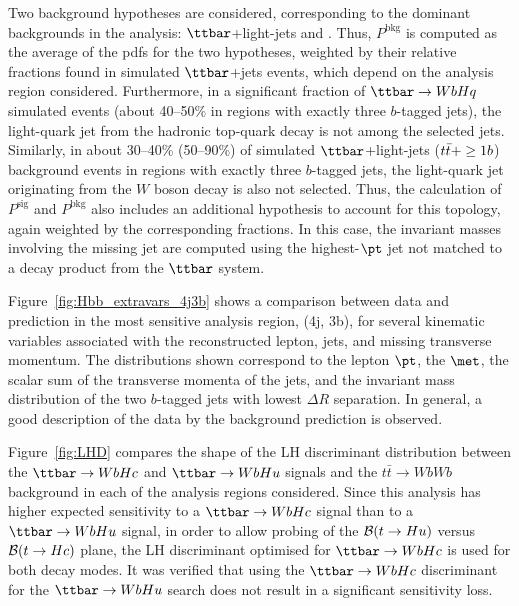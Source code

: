 Two background hypotheses are considered, corresponding to the dominant backgrounds in
the analysis: $\ttbar$+light-jets and \ttbin. Thus, $P^\textrm{bkg}$ is computed as the average of
the pdfs for the two hypotheses, weighted by their relative fractions found in simulated $\ttbar$+jets events, which depend
on the analysis region considered. Furthermore, in a significant fraction of $\Hq$ simulated events (about 40--50\% in regions with exactly three $b$-tagged jets), 
the light-quark jet from the hadronic top-quark decay is not among the selected jets.
Similarly, in about 30--40\% (50--90\%) of simulated $\ttbar$+light-jets ($t\bar{t}+\geq1b$) background events in regions with exactly three $b$-tagged jets, 
the light-quark jet originating from the $W$ boson decay is also not selected. Thus, the calculation of $P^\textrm{sig}$ and
$P^\textrm{bkg}$ also includes an additional hypothesis to account for this topology, again weighted by the corresponding fractions. 
In this case, the invariant masses involving the missing jet are computed using the highest-$\pt$ jet not matched 
to a decay product from the $\ttbar$ system.


Figure~\ref{fig:Hbb_extravars_4j3b} shows a comparison between data and prediction in the most sensitive analysis region, (4j, 3b), 
for several kinematic variables associated with the reconstructed lepton, jets, and missing transverse momentum. 
The distributions shown correspond to the lepton $\pt$, the $\met$, the scalar sum of the transverse momenta of 
the jets, and the invariant mass distribution of the two $b$-tagged jets with lowest $\Delta R$ separation.
In general, a good description of the data by the background prediction is observed.

Figure~\ref{fig:LHD} compares the shape of the LH discriminant distribution between the $\Hc$ and $\Hu$ signals and the 
$t\bar{t}\to WbWb$ background in each of the analysis regions considered.
Since this analysis has higher expected sensitivity to a $\Hc$ signal than to a $\Hu$ signal, in order to allow probing 
of the $\mathcal{B}(t\to Hu)$ versus $\mathcal{B}(t\to Hc)$ plane, the LH discriminant optimised for $\Hc$ is used for both 
decay modes. It was verified that using the $\Hc$ discriminant for the $\Hu$ search does not result in a significant sensitivity loss.


